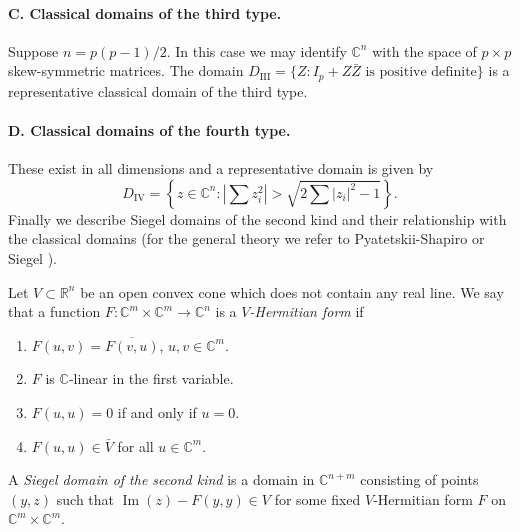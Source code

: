 \paragraph*{C. Classical domains of the third type.} Suppose $n=p(p-1)/2$. In this case we may identify $\mathbb C^n$ with the space of $p\times p$ skew-symmetric matrices. The domain $D_{\mathrm {III}}=\{Z:I_p+Z\bar Z\text{ is positive definite}\}$ is a representative classical domain of the third type.

\paragraph*{D. Classical domains of the fourth type.} These exist in all dimensions and a representative domain is given by
\[
D_{\mathrm {IV}}=\left\{z\in\mathbb C^n:\left|\sum z_i^2\right|>\sqrt{2\sum|z_i|^2-1}\right\}.
\]
Finally we describe Siegel domains of the second kind and their relationship with the classical domains (for the general theory we refer to Pyatetskii-Shapiro \cite{bib:I:pyatetskii-shapiro-i-i:1} or Siegel \cite{bib:I:siegel-c-l:2}).

 Let $V\subset\mathbb R^n$ be an open convex cone which does not contain any real line. We say that a function $F:\mathbb C^m\times\mathbb C^m\longrightarrow\mathbb C^n$ is a \emph{$V$-Hermitian form} if
\begin{enumerate}
\item $F(u,v)=\overline{F(v,u)}$, $u,v\in\mathbb C^m$.
\item $F$ is $\mathbb C$-linear in the first variable.
\item $F(u,u)=0$ if and only if $u=0$.
\item $F(u,u)\in\bar V$ for all $u\in\mathbb C^m$.
\end{enumerate}

 A \emph{Siegel domain of the second kind} is a domain in $\mathbb C^{n+m}$ consisting of points $(y,z)$ such that $\operatorname{Im}(z)-F(y,y)\in V$ for some fixed $V$-Hermitian form $F$ on $\mathbb C^m\times\mathbb C^m$.

